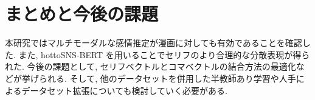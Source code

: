 \documentclass[a4paper,twoside,twocolumn,10pt]{jarticle}     %
\begin{document}
%

\begin{table}[h]
\vspace{-2mm}
\begin{center}
\caption{実験結果}
\end{center}
\vspace{-10mm}
\end{table}

\section{まとめと今後の課題}
本研究ではマルチモーダルな感情推定が漫画に対しても有効であることを確認した. また, hottoSNS-BERT を用いることでセリフのより合理的な分散表現が得られた. 今後の課題として, セリフベクトルとコマベクトルの結合方法の最適化などが挙げられる. そして, 他のデータセットを併用した半教師あり学習や人手によるデータセット拡張についても検討していく必要がある.




\end{document}
